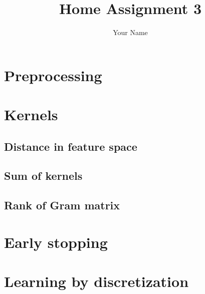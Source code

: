 \documentclass[a4paper,12pt]{article}
\begin{document}
\title{\large Home Assignment 3}
\author{Your Name}
\maketitle
\tableofcontents
\newpage

\section{Preprocessing}

\section{Kernels}
\subsection{Distance in feature space}
\subsection{Sum of kernels}
\subsection{Rank of Gram matrix}
\section{Early stopping}
\section{Learning by discretization}
\end{document}
